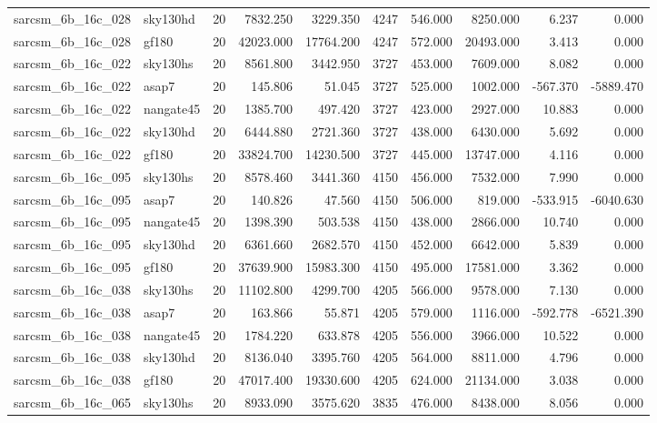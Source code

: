 \begin{tabular}{llrrrrrrrr}
sarcsm\_6b\_16c\_028 & sky130hd & 20 & 7832.250 & 3229.350 & 4247 & 546.000 & 8250.000 & 6.237 & 0.000 \\
sarcsm\_6b\_16c\_028 & gf180 & 20 & 42023.000 & 17764.200 & 4247 & 572.000 & 20493.000 & 3.413 & 0.000 \\
sarcsm\_6b\_16c\_022 & sky130hs & 20 & 8561.800 & 3442.950 & 3727 & 453.000 & 7609.000 & 8.082 & 0.000 \\
sarcsm\_6b\_16c\_022 & asap7 & 20 & 145.806 & 51.045 & 3727 & 525.000 & 1002.000 & -567.370 & -5889.470 \\
sarcsm\_6b\_16c\_022 & nangate45 & 20 & 1385.700 & 497.420 & 3727 & 423.000 & 2927.000 & 10.883 & 0.000 \\
sarcsm\_6b\_16c\_022 & sky130hd & 20 & 6444.880 & 2721.360 & 3727 & 438.000 & 6430.000 & 5.692 & 0.000 \\
sarcsm\_6b\_16c\_022 & gf180 & 20 & 33824.700 & 14230.500 & 3727 & 445.000 & 13747.000 & 4.116 & 0.000 \\
sarcsm\_6b\_16c\_095 & sky130hs & 20 & 8578.460 & 3441.360 & 4150 & 456.000 & 7532.000 & 7.990 & 0.000 \\
sarcsm\_6b\_16c\_095 & asap7 & 20 & 140.826 & 47.560 & 4150 & 506.000 & 819.000 & -533.915 & -6040.630 \\
sarcsm\_6b\_16c\_095 & nangate45 & 20 & 1398.390 & 503.538 & 4150 & 438.000 & 2866.000 & 10.740 & 0.000 \\
sarcsm\_6b\_16c\_095 & sky130hd & 20 & 6361.660 & 2682.570 & 4150 & 452.000 & 6642.000 & 5.839 & 0.000 \\
sarcsm\_6b\_16c\_095 & gf180 & 20 & 37639.900 & 15983.300 & 4150 & 495.000 & 17581.000 & 3.362 & 0.000 \\
sarcsm\_6b\_16c\_038 & sky130hs & 20 & 11102.800 & 4299.700 & 4205 & 566.000 & 9578.000 & 7.130 & 0.000 \\
sarcsm\_6b\_16c\_038 & asap7 & 20 & 163.866 & 55.871 & 4205 & 579.000 & 1116.000 & -592.778 & -6521.390 \\
sarcsm\_6b\_16c\_038 & nangate45 & 20 & 1784.220 & 633.878 & 4205 & 556.000 & 3966.000 & 10.522 & 0.000 \\
sarcsm\_6b\_16c\_038 & sky130hd & 20 & 8136.040 & 3395.760 & 4205 & 564.000 & 8811.000 & 4.796 & 0.000 \\
sarcsm\_6b\_16c\_038 & gf180 & 20 & 47017.400 & 19330.600 & 4205 & 624.000 & 21134.000 & 3.038 & 0.000 \\
sarcsm\_6b\_16c\_065 & sky130hs & 20 & 8933.090 & 3575.620 & 3835 & 476.000 & 8438.000 & 8.056 & 0.000 \\

\end{tabular}
